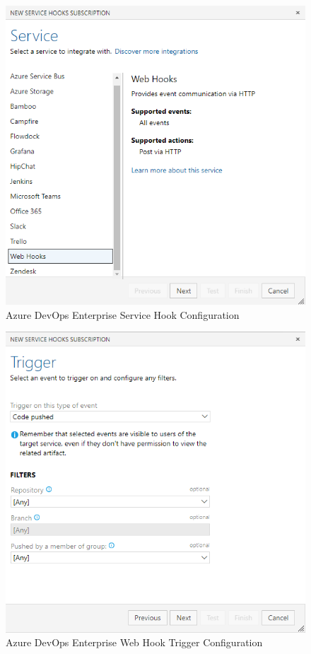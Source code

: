 \begin{figure}[ht]
    \includegraphics[width=\textwidth]{graphics/adoe-service-hooks-sub.png}
    \caption{Azure DevOps Enterprise Service Hook Configuration}
    \label{fig:adoe-hook-config}
\end{figure}

\begin{figure}[ht]
    \includegraphics[width=\textwidth]{graphics/adoe-hook-trigger-config.png}
    \caption{Azure DevOps Enterprise Web Hook Trigger Configuration}
    \label{fig:adoe-trigger-config}
\end{figure}

